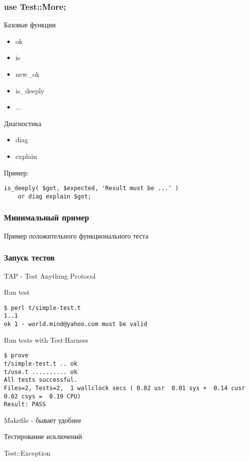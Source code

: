 \documentclass{beamer}
\begin{document}
\begin{frame}[fragile]
\frametitle{use Test::More;}
Базовые функции
\begin{itemize}
\item ok
\item is
\item new\_ok
\item is\_deeply
\item ...
\end{itemize}
Диагностика
\begin{itemize}
\item diag
\item explain
\end{itemize}
Пример:
\begin{lstlisting}
is_deeply( $got, $expected, 'Result must be ...' )
    or diag explain $got;
\end{lstlisting}
\end{frame}

\begin{frame}[fragile]
\frametitle{Минимальный пример}
\begin{block}{Пример положительного функционального теста}

\end{block}
\end{frame}

\begin{frame}[fragile]
\frametitle{Запуск тестов}
TAP - Test Anything Protocol
\begin{block}{Run test}
\begin{verbatim}
$ perl t/simple-test.t
1..1
ok 1 - world.mind@yahoo.com must be valid
\end{verbatim}
\end{block}
\begin{block}{Run tests with Test:Harness}
\begin{verbatim}
$ prove
t/simple-test.t .. ok   
t/use.t .......... ok   
All tests successful.
Files=2, Tests=2,  1 wallclock secs ( 0.02 usr  0.01 sys +  0.14 cusr  0.02 csys =  0.19 CPU)
Result: PASS
\end{verbatim}
\end{block}
Makefile - бывает удобнее
\end{frame}

\begin{frame}{Тестирование исключений}
\begin{block}{Test::Exception}

\end{block}
\end{frame}
\end{document}
